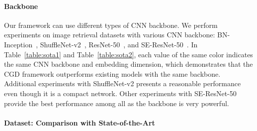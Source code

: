 \documentclass[10pt,twocolumn,letterpaper]{article}
\begin{document}
\begin{CJK}{UTF8}{mj}
\vspace{-4mm}
\paragraph{Backbone}
Our framework can use different types of CNN backbone.
We perform experiments on image retrieval datasets with various CNN backbone: BN-Inception~\cite{ioffe2015batch}, ShuffleNet-v2~\cite{ma2018shufflenet}, ResNet-50~\cite{he2016deep}, and SE-ResNet-50~\cite{hu2018squeeze}.
In Table~\ref{table:sota1} and Table~\ref{table:sota2}, each value of the same color indicates the same CNN backbone and embedding dimension, which demonstrates that the CGD framework outperforms existing models with the same backbone.
Additional experiments with ShuffleNet-v2 presents a reasonable performance even though it is a compact network.
Other experiments with SE-ResNet-50 provide the best performance among all as the backbone is very powerful.


\vspace{-4mm}
\paragraph{Dataset: Comparison with State-of-the-Art}



\end{CJK}
\end{document}
